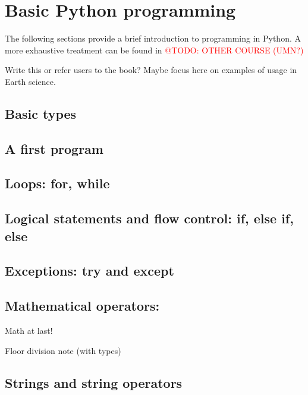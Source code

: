 \documentclass[a4paper,10pt]{amsart}
\makeatletter
\newcommand{\todo}[1]{\textcolor{red}{@TODO: #1}}
\makeatother
\begin{document}
\section{Basic Python programming}

The following sections provide a brief introduction to programming in Python. A more exhaustive treatment can be found in \todo{OTHER COURSE (UMN?)}

Write this or refer users to the book? Maybe focus here on examples of usage in Earth science.

\subsection{Basic types}

\subsection{}

\subsection{A first program}

\subsection{Loops: for, while}

\subsection{Logical statements and flow control: if, else if, else}

\subsection{Exceptions: try and except}

\subsection{Mathematical operators: }

Math at last!

Floor division note (with types)

\subsection{Strings and string operators}
\end{document}

